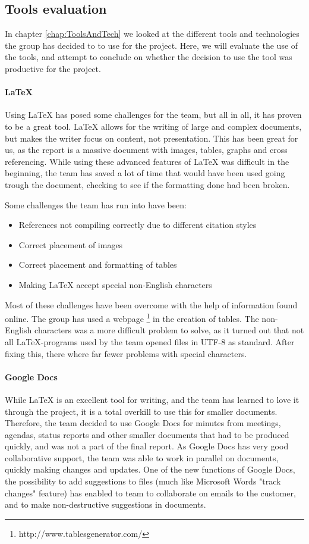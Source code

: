 \documentclass[11pt,a4paper,titlepage,oneside]{report}
\begin{document}
\subsection{Tools evaluation}
\label{subsec:ToolsEvaluation}
In chapter \ref{chap:ToolsAndTech} we looked at the different tools and technologies the group has decided to to use for the project. Here, we will evaluate the use of the tools, and attempt to conclude on whether the decision to use the tool was productive for the project.

\paragraph{\LaTeX}
Using \LaTeX{} has posed some challenges for the team, but all in all, it has proven to be a great tool. \LaTeX{} allows for the writing of large and complex documents, but makes the writer focus on content, not presentation. This has been great for us, as the report is a massive document with images, tables, graphs and cross referencing. While using these advanced features of \LaTeX{} was difficult in the beginning, the team has saved a lot of time that would have been used going trough the document, checking to see if the formatting done had been broken. 

Some challenges the team has run into have been:
\begin{itemize}
\item References not compiling correctly due to different citation styles
\item Correct placement of images
\item Correct placement and formatting of tables
\item Making LaTeX accept special non-English characters
\end{itemize}

Most of these challenges have been overcome with the help of information found online. The group has used a webpage \footnote{http://www.tablesgenerator.com/} in the creation of tables. The non-English characters was a more difficult problem to solve, as it turned out that not all \LaTeX-programs used by the team opened files in UTF-8 as standard. After fixing this, there where far fewer problems with special characters.

\paragraph{Google Docs}
While \LaTeX{} is an excellent tool for writing, and the team has learned to love it through the project, it is a total overkill to use this for smaller documents. Therefore, the team decided to use Google Docs for minutes from meetings, agendas, status reports and other smaller documents that had to be produced quickly, and was not a part of the final report. As Google Docs has very good collaborative support, the team was able to work in parallel on documents, quickly making changes and updates. One of the new functions of Google Docs, the possibility to add suggestions to files (much like Microsoft Words "track changes" feature) has enabled to team to collaborate on emails to the customer, and to make non-destructive suggestions in documents.
\end{document}
